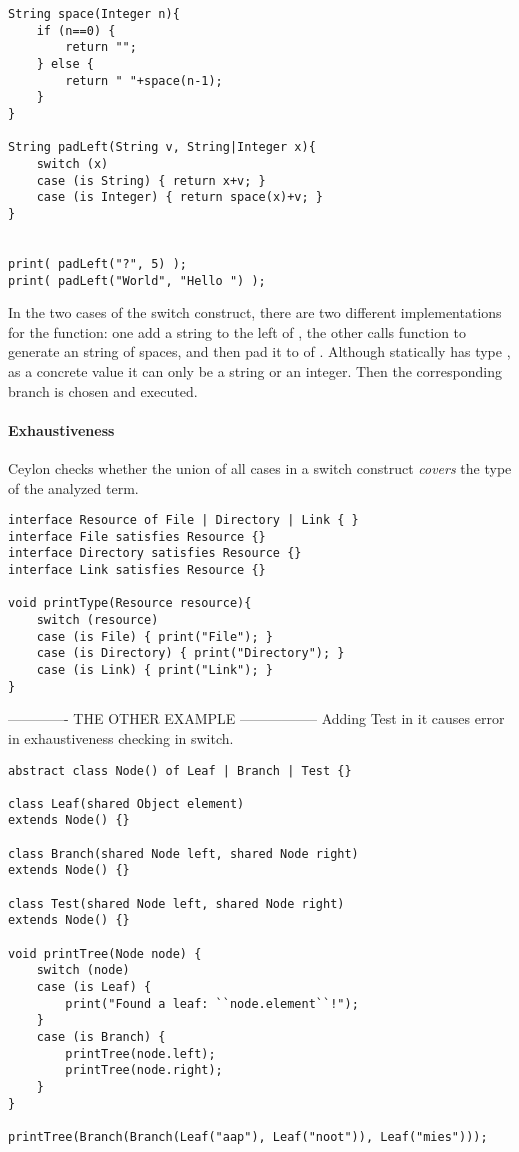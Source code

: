 
\begin{lstlisting}
String space(Integer n){
	if (n==0) {
		return "";
	} else {
		return " "+space(n-1);
	}
}

String padLeft(String v, String|Integer x){
	switch (x)
	case (is String) { return x+v; }
	case (is Integer) { return space(x)+v; }
}


print( padLeft("?", 5) );
print( padLeft("World", "Hello ") );
\end{lstlisting}
%
In the two cases of the switch construct, there are two different implementations
for the  function: one add a string to the left of ,
the other calls function  to generate an string of  spaces,
and then pad it to of .
Although statically  has type , as a concrete value 
it can only be a string or an integer.
Then the corresponding branch is chosen and executed.


\paragraph{Exhaustiveness}
Ceylon checks whether the union of all cases in a switch construct
\emph{covers} the type of the analyzed term.
\begin{lstlisting}
interface Resource of File | Directory | Link { }
interface File satisfies Resource {}
interface Directory satisfies Resource {}
interface Link satisfies Resource {}

void printType(Resource resource){
	switch (resource) 
	case (is File) { print("File"); }
	case (is Directory) { print("Directory"); }
	case (is Link) { print("Link"); }
}
\end{lstlisting}

------------- THE OTHER EXAMPLE -----------------
Adding Test in it causes error in exhaustiveness checking in switch.

\begin{lstlisting}
abstract class Node() of Leaf | Branch | Test {}

class Leaf(shared Object element) 
extends Node() {}

class Branch(shared Node left, shared Node right) 
extends Node() {}

class Test(shared Node left, shared Node right) 
extends Node() {}

void printTree(Node node) {
	switch (node)
	case (is Leaf) {
		print("Found a leaf: ``node.element``!");
	}
	case (is Branch) {
		printTree(node.left);
		printTree(node.right);
	}
}

printTree(Branch(Branch(Leaf("aap"), Leaf("noot")), Leaf("mies")));
\end{lstlisting}

